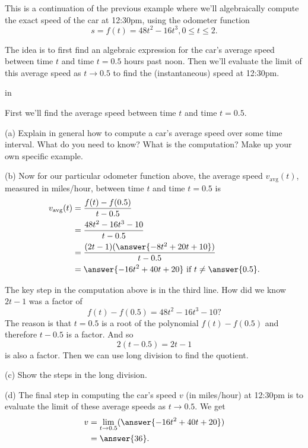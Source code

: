 \documentclass{ximera}
\newcommand{\pskip}{\vskip 0.1 in}
\begin{document}
\begin{example} \label{Exsdf4r55ytyh}
This is a continuation of the previous example where we'll algebraically compute the exact speed of the car at 12:30pm, using the odometer function
\[
     s = f(t) = 48t^2 - 16t^3, 0\leq t \leq 2.
\]

The idea is to first find an algebraic expression for the car's average speed between time $t$ and time $t=0.5$ hours past noon. Then we'll evaluate the limit of this average speed as $t\to 0.5$ to find the (instantaneous) speed at 12:30pm.

\pskip


First we'll find the average speed between time $t$ and time $t=0.5$. 

(a) Explain in general how to compute a car's average speed over some time interval. What do you need to know? What is the computation? Make up your own specific example.

(b) Now for our particular odometer function above, the average speed $v_{\text{avg}}(t)$, measured in miles/hour, between time $t$ and time $t=0.5$ is
\begin{align*}
   v_{\text{avg}}(t) &= \frac{f(t) - f(0.5)}{t - 0.5} \\
                        &= \frac{48t^2 - 16t^3 - 10 }{t-0.5} \\
                        &= \frac{(2t-1)(\answer{-8t^2 + 20t + 10})}{t-0.5} \\
                        & = \answer{-16t^2+40t + 20} \text{ if } t\neq \answer{0.5}.
\end{align*}

The key step in the computation above is in the third line. How did we know $2t-1$ was a factor of 
\[
   f(t) - f(0.5) = 48t^2 - 16t^3 - 10 ?
\]  
The reason is that $t=0.5$ is a root of the polynomial $f(t)-f(0.5)$ and therefore $t - 0.5$ is a factor. And so 
\[
   2(t-0.5) = 2t-1
\]
is also a factor. Then we can use long division to find the quotient.

(c) Show the steps in the long division.

(d) The final step in computing the car's speed $v$ (in miles/hour) at 12:30pm is to evaluate the limit of these average speeds as $t\to 0.5$. We get
\begin{align*}
    v &= \lim_{t\to 0.5} (\answer{-16t^2+40t + 20}) \\
       & = \answer{36} .
\end{align*}



\end{example}
\end{document}

